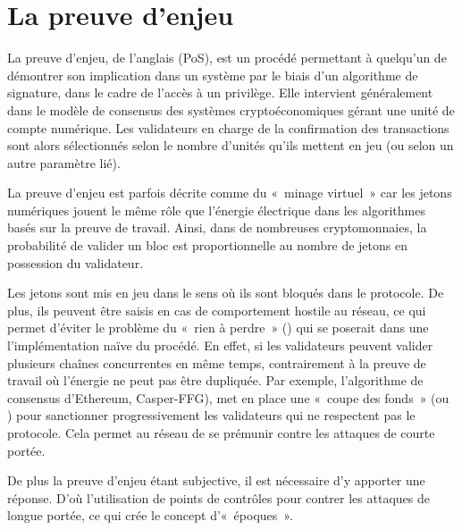 \section*{La preuve d'enjeu}

La preuve d'enjeu, de l'anglais  (PoS), est un procédé permettant à quelqu'un de démontrer son implication dans un système par le biais d'un algorithme de signature, dans le cadre de l'accès à un privilège. Elle intervient généralement dans le modèle de consensus des systèmes cryptoéconomiques gérant une unité de compte numérique. Les validateurs en charge de la confirmation des transactions sont alors sélectionnés selon le nombre d'unités qu'ils mettent en jeu (ou selon un autre paramètre lié).

La preuve d'enjeu est parfois décrite comme du «~minage virtuel~» car les jetons numériques jouent le même rôle que l'énergie électrique dans les algorithmes basés sur la preuve de travail. Ainsi, dans de nombreuses cryptomonnaies, la probabilité de valider un bloc est proportionnelle au nombre de jetons en possession du validateur.

Les jetons sont mis en jeu dans le sens où ils sont bloqués dans le protocole. De plus, ils peuvent être saisis en cas de comportement hostile au réseau, ce qui permet d'éviter le problème du «~rien à perdre~» () qui se poserait dans une l'implémentation naïve du procédé. En effet, si les validateurs peuvent valider plusieurs chaînes concurrentes en même temps, contrairement à la preuve de travail où l'énergie ne peut pas être dupliquée. Par exemple, l'algorithme de consensus d'Ethereum, Casper-FFG), met en place une «~coupe des fonds~» (ou ) pour sanctionner progressivement les validateurs qui ne respectent pas le protocole. Cela permet au réseau de se prémunir contre les attaques de courte portée.

%
De plus la preuve d'enjeu étant subjective, il est nécessaire d'y apporter une réponse. D'où l'utilisation de points de contrôles pour contrer les attaques de longue portée, ce qui crée le concept d'«~époques~».

